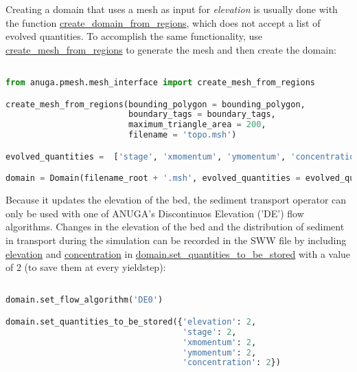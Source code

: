 \documentclass[10pt]{article}
\begin{document}
Creating a domain that uses a mesh as input for \textit{elevation} is usually done with the function \url{create_domain_from_regions}, which does not accept a list of evolved quantities. To accomplish the same functionality, use \url{create_mesh_from_regions} to generate the mesh and then create the domain:

\begin{minipage}[c]{0.95\textwidth}
\begin{lstlisting}[language=Python, title=Creating a domain from a mesh file]

from anuga.pmesh.mesh_interface import create_mesh_from_regions

create_mesh_from_regions(bounding_polygon = bounding_polygon,
                         boundary_tags = boundary_tags,
                         maximum_triangle_area = 200,
                         filename = 'topo.msh')

evolved_quantities =  ['stage', 'xmomentum', 'ymomentum', 'concentration']

domain = Domain(filename_root + '.msh', evolved_quantities = evolved_quantities)


\end{lstlisting}
\end{minipage}

Because it updates the elevation of the bed, the sediment transport operator can only be used with one of ANUGA's Discontinuos Elevation ('DE') flow algorithms. Changes in the elevation of the bed and the distribution of sediment in transport during the simulation can be recorded in the SWW file by including \url{elevation} and \url{concentration} in \url{domain.set_quantities_to_be_stored} with a value of 2 (to save them at every yieldstep):

\begin{minipage}[c]{0.95\textwidth}
\begin{lstlisting}[language=Python, title=Setting the flow algorithm and recording the output]

domain.set_flow_algorithm('DE0')

domain.set_quantities_to_be_stored({'elevation': 2,
                                    'stage': 2,
                                    'xmomentum': 2,
                                    'ymomentum': 2,
                                    'concentration': 2})

\end{lstlisting}
\end{minipage}
\end{document}
